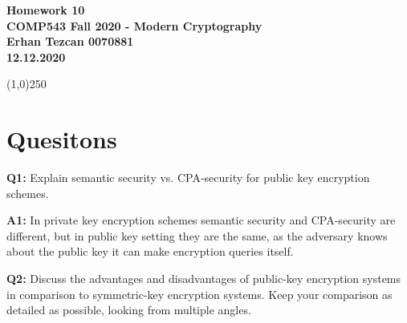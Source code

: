 \documentclass[12pt,reqno]{amsart}
\newcommand{\code}[1]{\texttt{#1}}
\begin{document}
\begin{center}
\large\textbf{Homework 10 \\ COMP543 Fall 2020 - Modern Cryptography \\}
\normalsize\textbf{ Erhan Tezcan 0070881 \\ 12.12.2020} \\
\end{center}

\begin{center}
\line(1,0){250}
\end{center}

%
%

%
%

\section{Quesitons}
\textbf{Q1:} Explain semantic security vs. CPA-security for public key encryption schemes.

\textbf{A1:} In private key encryption schemes semantic security and CPA-security are different, but in public key setting they are the same, as the adversary knows about the public key it can make encryption queries itself.

\vspace{20px}
\textbf{Q2:} Discuss the advantages and disadvantages of public-key encryption systems in comparison to symmetric-key encryption systems. Keep your comparison as detailed as possible, looking from multiple angles.
\end{document}
